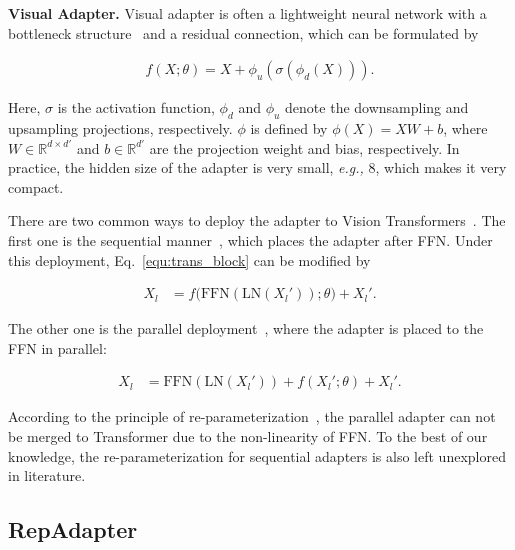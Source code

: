 \textbf{ Visual Adapter.} Visual adapter  is  often a lightweight  neural  network with    a bottleneck structure~\cite{adapter,adaptformer} and a residual connection, which can be formulated by

\begin{equation}
\label{equ:adapter}
\begin{aligned} 
f(X;\theta)=X+ \phi_u(\sigma(\phi_d(X))).
\end{aligned}
\end{equation}

Here, $\sigma$ is the activation function, $\phi_d$ and $\phi_u$ denote the downsampling and upsampling projections, respectively. $\phi$ is defined by $\phi(X)=XW+b$, where $W \in \mathbb{R}^{d \times d'}$ and $b \in \mathbb{R}^{d'}$ are  the projection weight and bias, respectively. In practice, the hidden size of the adapter is very small, \emph{e.g.,} 8, which makes it very  compact.

There are two common ways to deploy  the adapter to Vision Transformers~\cite{adapter,adaptformer}. The first one is  the   sequential manner~\cite{adapter}, which  places the  adapter after FFN.   Under this deployment,  Eq.~\ref{equ:trans_block} can be modified by

\begin{equation}
\label{equ:seq_insert}
\begin{aligned} 
X_l&=f\big(\text{FFN}(\text{LN}(X_l'));\theta \big)+X_l'.
\end{aligned}
\end{equation}

The other one is the parallel deployment~\cite{adaptformer}, where the adapter is placed to  the FFN in parallel:

\begin{equation}
\label{equ:pra_insert}
\begin{aligned} 
X_l&=\text{FFN}(\text{LN}(X_l'))+ f(X_l';\theta)+ X_l'.
\end{aligned}
\end{equation}

According to the principle of re-parameterization~\cite{repvgg,acnet}, the parallel adapter can not be  merged to Transformer due to the non-linearity of FFN.   To  the best of our  knowledge, the re-parameterization for  sequential  adapters  is  also left unexplored in literature. 

\subsection{RepAdapter}

